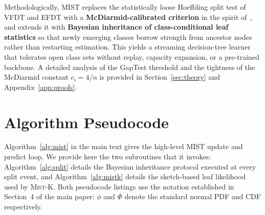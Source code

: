 \documentclass{article}
\newcommand{\mist}{\textsc{Mist}}
\begin{document}
Methodologically, MIST replaces the statistically loose Hoeffding split test of
VFDT and EFDT with a \textbf{McDiarmid-calibrated criterion} in the spirit
of~\cite{rutkowski2013}, and extends it with \textbf{Bayesian inheritance of
class-conditional leaf statistics} so that newly emerging classes borrow strength
from ancestor nodes rather than restarting estimation.
This yields a streaming decision-tree learner that tolerates open class sets
without replay, capacity expansion, or a pre-trained backbone.
A detailed analysis of the GapTest threshold and the tightness of the
McDiarmid constant $c_i = 4/n$ is provided in Section~\ref{sec:theory}
and Appendix~\ref{app:proofs}.


\section{Algorithm Pseudocode}
\label{app:algorithms}

Algorithm~\ref{alg:mist} in the main text gives the high-level MIST update and
predict loop. We provide here the two subroutines that it invokes:
Algorithm~\ref{alg:split} details the Bayesian inheritance protocol executed at
every split event, and Algorithm~\ref{alg:mistk} details the sketch-based leaf
likelihood used by \mist{}-K. Both pseudocode listings use the notation
established in Section~4 of the main paper; $\phi$ and $\Phi$ denote the
standard normal PDF and CDF respectively.
\end{document}
